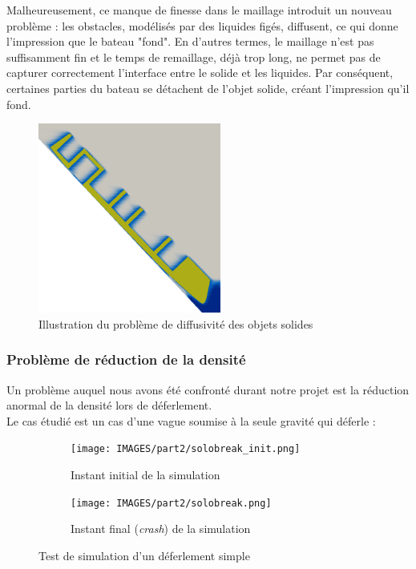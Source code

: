\documentclass[../main.tex]{subfiles}
\begin{document}
Malheureusement, ce manque de finesse dans le maillage introduit un nouveau problème : les obstacles, modélisés par des liquides figés, diffusent, ce qui donne l'impression que le bateau "fond". En d'autres termes, le maillage n'est pas suffisamment fin et le temps de remaillage, déjà trop long, ne permet pas de capturer correctement l'interface entre le solide et les liquides. Par conséquent, certaines parties du bateau se détachent de l'objet solide, créant l'impression qu'il fond.\\  

\begin{figure}[H]
    \centering
    \includegraphics[width=6cm]{IMAGES/part2/zephyr_launching.0008.png}
    \caption{Illustration du problème de diffusivité des objets solides}
\end{figure}

\subsubsection*{Problème de réduction de la densité}
Un problème auquel nous avons été confronté durant notre projet est la réduction anormal de la densité lors de déferlement.\\
Le cas étudié est un cas d'une vague soumise à la seule gravité qui déferle :
\begin{figure}
\centering
\begin{subfigure}[b]{11cm}
    \centering
    \texttt{[image: IMAGES/part2/solobreak\_init.png]}
    \caption{Instant initial de la simulation}
\end{subfigure}
\vfill
\begin{subfigure}[b]{11cm}
    \centering
    \texttt{[image: IMAGES/part2/solobreak.png]}
    \caption{Instant final (\textit{crash}) de la simulation}
\end{subfigure}
\caption{Test de simulation d'un déferlement simple}
\end{figure}
\end{document}
